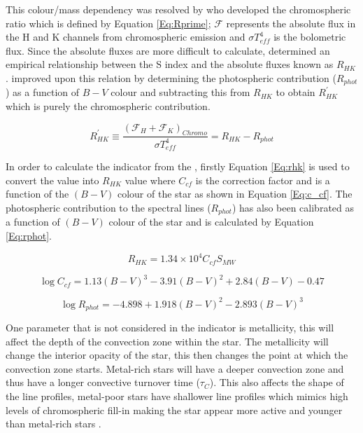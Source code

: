 This colour/mass dependency was resolved by \citet{Noyes_etal_1984} who developed the chromospheric ratio \Rprime which is defined by Equation \ref{Eq:Rprime}; $\mathcal{F}$ represents the absolute flux in the H and K channels from chromospheric emission and $\sigma T_{eff}^{4}$ is the bolometric flux. Since the absolute fluxes are more difficult to calculate, \citet{Middelkoop_1982} determined an empirical relationship between the S index and the absolute fluxes known as $R_{HK}$. \citet{Noyes_etal_1984} improved upon this relation by determining the photospheric contribution ($R_{phot}$) as a function of $B-V$ colour and subtracting this from $R_{HK}$ to obtain $R^{'}_{HK}$ which is purely the chromospheric contribution.

\begin{equation}
    R^{'}_{HK} \equiv \frac{(\mathcal{F}_{H} + \mathcal{F}_{K})_{Chromo}}{\sigma T_{eff}^{4}} = R_{HK} - R_{phot}
    \label{Eq:Rprime}
\end{equation}

In order to calculate the \Rprime indicator from the \Smw, firstly Equation \ref{Eq:rhk} is used to convert the \Smw value into $R_{HK}$ value where $C_{cf}$ is the correction factor and is a function of the $(B-V)$ colour of the star as shown in Equation \ref{Eq:c_cf}. The photospheric contribution to the \caII spectral lines ($R_{phot}$) has also been calibrated as a function of $(B-V)$ colour of the star and is calculated by Equation \ref{Eq:rphot}.

\begin{equation}
    R_{HK} = 1.34{\times}10^{4}C_{cf}S_{MW}
    \label{Eq:rhk}
\end{equation}

\begin{equation}
    \log C_{cf} = 1.13(B - V)^{3} - 3.91(B-V)^{2} + 2.84(B-V) - 0.47
    \label{Eq:c_cf}
\end{equation}

\begin{equation}
    \log R_{phot} = -4.898 + 1.918(B-V)^{2} - 2.893(B-V)^{3}
    \label{Eq:rphot}
\end{equation}

One parameter that is not considered in the \Rprime indicator is metallicity, this will affect the depth of the convection zone within the star. The metallicity will change the interior opacity of the star, this then changes the point at which the convection zone starts. Metal-rich stars will have a deeper convection zone and thus have a longer convective turnover time ($\tau_{C}$). This also affects the shape of the \caII line profiles, metal-poor stars have shallower line profiles which mimics high levels of chromospheric fill-in making the star appear more active and younger than metal-rich stars \citep{Rocha-Pinto_Maciel_1998}.

